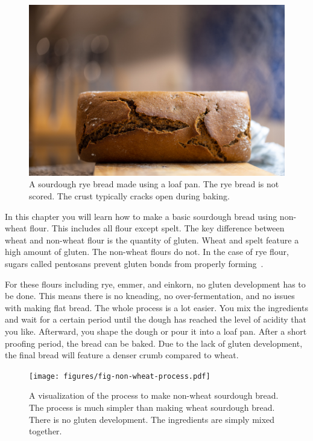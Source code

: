\begin{figure}[!htb]
  \includegraphics[width=\textwidth]{final-bread}
  \caption{A sourdough rye bread made using a loaf pan. The
  rye bread is not scored. The crust typically cracks
  open during baking.}%
  \label{fig:non-wheat-final-bread}
\end{figure}

In this chapter you will learn how to make a basic sourdough bread
using non-wheat flour. This includes all flour except spelt.
The key difference between wheat and non-wheat flour is
the quantity of gluten. Wheat and spelt feature a high amount
of gluten. The non-wheat flours do not. In the case of rye flour,
sugars called pentosans prevent gluten bonds from properly
forming~\cite{rye+pentosans}.

For these flours including rye, emmer, and einkorn, no gluten
development has to be done. This means there is no kneading,
no over-fermentation, and no issues with making flat bread.
The whole process
is a lot easier. You mix the ingredients and
wait for a certain period until the dough has
reached the level of acidity that you like. Afterward, you
shape the dough or pour it into a loaf pan. After a short proofing
period, the bread can be baked. Due to the lack
of gluten development, the final bread will feature a denser
crumb compared to wheat.

\begin{figure}[!htb]
  \texttt{[image: figures/fig-non-wheat-process.pdf]}
  \caption{A visualization of the process to make non-wheat sourdough bread.
  The process is much simpler than making wheat sourdough bread. There is
  no gluten development. The ingredients are simply mixed together.}%
  \label{fig:non-wheat-sourdough}
\end{figure}

